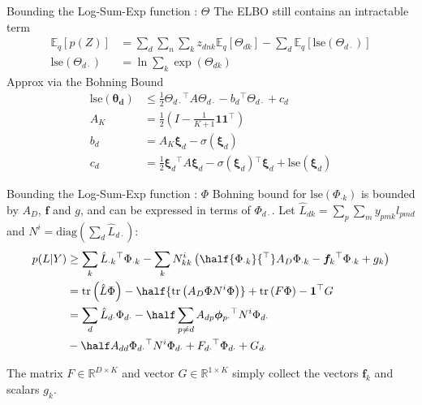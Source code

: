 \documentclass[xcolor=dvipsnames]{beamer}
\newcommand \thd   { { \boldsymbol{\theta}_d } }
\newcommand \zdnk  { { z_{dnk}           } }
\newcommand \vv[1]   { { \boldsymbol{#1} } }
\newcommand \T       { { ^\top } }
\newcommand \one     { { \boldsymbol{1} } }
\newcommand \diag[1] { { \text{diag}\left( #1 \right) } }
\newcommand \lse[1]  { { \text{lse}\left( #1 \right)  } }
\newcommand \ex[2]   { { \mathbb{E}_{{#1}}\left[ #2 \right] } }
\newcommand \xid { { \boldsymbol{\xi}_d } }
\newcommand \phdo { { \Phi_{d\cdot}    } }
\newcommand \phok { { \Phi_{\cdot k}   } }
\newcommand \MReal[2] { { \mathbb{R}^{#1 \times #2}  } }
\newcommand \Tr[1]    { { \text{tr}\left( #1 \right) } }
\begin{document}
\begin{frame}{Bounding the Log-Sum-Exp function : $\Theta$}
The ELBO still contains an intractable term
\begin{align*}
\ex{q}{p(Z)} & = \sum_d \sum_n \sum_k \zdnk \ex{q}{\Theta_{dk}} 
- \sum_d \ex{q}{\lse{\Theta_{d\cdot}}} \\
\lse{\Theta_{d\cdot}} & = \ln \sum_k \exp(\Theta_{dk})
\end{align*}
Approx via the Bohning Bound\cite{Bohning1988a}
\begin{align*}
\lse{\vv{\thd}} &  \leq \frac{1}{2} \Theta_{d\cdot}\T A \Theta_{d\cdot} - b_d\T \Theta_{d\cdot} + c_d \\
A_K & = \frac{1}{2}(I - \frac{1}{K+1} \one \one\T) \\
b_d & = A_K \xid  - \sigma(\xid) \\
c_d & = \frac{1}{2}\xid\T A \xid  - \sigma(\xid)\T\xid + \lse{\xid}
\end{align*}

\end{frame}

\begin{frame}{Bounding the Log-Sum-Exp function : $\Phi$}
Bohning bound for $\lse{\phok}$ is bounded by $A_D$, $\vv{f}$ and $g$, and can be expressed in terms of $\phdo$. Let $\hat{L}_{dk} = \sum_p \sum_m y_{pmk} l_{pmd}$ and $N^i = \diag{\sum_d \hat{L}_{d\cdot}}$:
\begin{equation*}
\begin{aligned}
p(L|Y) & \geq \sum_k \hat{L}_{\cdot k}\T \phok  - \sum_k N^i_{kk} \left(\half \phok\T A_D \phok - \vv{f}_k\T \phok + g_k\right) \\
& = \Tr{\hat{L} \Phi} - \half \Tr{A_D \Phi N^i \Phi} + \Tr{F \Phi} - \one\T G  \\
& = \sum_d \hat{L}_{d\cdot} \phdo - \half \sum_{p \neq d} A_{dp} \vv{\phi}_{p\cdot}\T N^i \phdo \\
&-\half A_{dd} \phdo\T N^i \phdo + F_{d\cdot}\T\phdo + G_{d\cdot}
\end{aligned}
\end{equation*}

The matrix $F \in \MReal{D}{K}$ and vector $G \in \MReal{1}{K}$ simply collect the vectors $\vv{f}_k$ and scalars $g_k$.

\end{frame}
\end{document}
